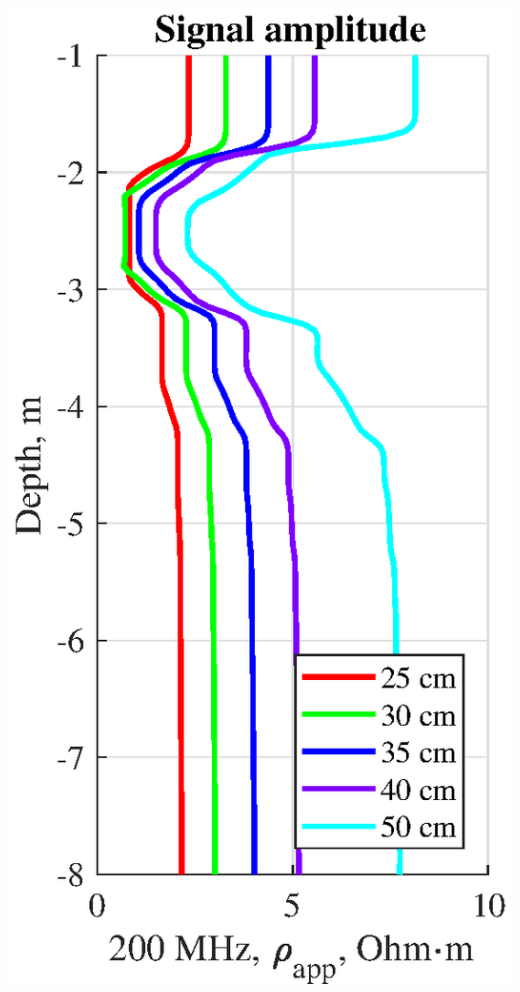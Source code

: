 \documentclass[aspectratio=169]{beamer}
\begin{document}
\begin{frame}
\begin{columns}[c]
\includegraphics[scale=0.44]{cement_solid_logg_rapp.eps}

\end{columns}


\end{frame}

\end{document}
